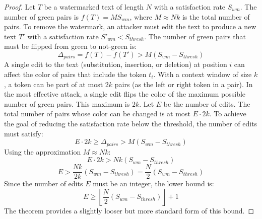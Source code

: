 \begin{proof}
Let $T$ be a watermarked text of length $N$ with a satisfaction rate $S_{wm}$. The number of green pairs is $f(T) = M S_{wm}$, where $M \approx Nk$ is the total number of pairs.
To remove the watermark, an attacker must edit the text to produce a new text $T'$ with a satisfaction rate $S'_{wm} < S_{thresh}$.
The number of green pairs that must be flipped from green to not-green is:
$$\Delta_{pairs} = f(T) - f(T') > M(S_{wm} - S_{thresh})$$
A single edit to the text (substitution, insertion, or deletion) at position $i$ can affect the color of pairs that include the token $t_i$. With a context window of size $k$, a token can be part of at most $2k$ pairs (as the left or right token in a pair).
In the most effective attack, a single edit flips the color of the maximum possible number of green pairs. This maximum is $2k$.
Let $E$ be the number of edits. The total number of pairs whose color can be changed is at most $E \cdot 2k$.
To achieve the goal of reducing the satisfaction rate below the threshold, the number of edits must satisfy:
$$E \cdot 2k \ge \Delta_{pairs} > M(S_{wm} - S_{thresh})$$
Using the approximation $M \approx Nk$:
$$E \cdot 2k > Nk(S_{wm} - S_{thresh})$$
$$E > \frac{Nk}{2k}(S_{wm} - S_{thresh}) = \frac{N}{2}(S_{wm} - S_{thresh})$$
Since the number of edits $E$ must be an integer, the lower bound is:
$$E \ge \left\lfloor \frac{N}{2}(S_{wm} - S_{thresh}) \right\rfloor + 1$$
The theorem provides a slightly looser but more standard form of this bound.
\end{proof}